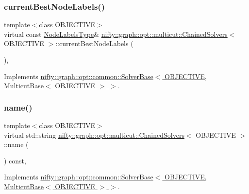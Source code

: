 \subsubsection{\texorpdfstring{current\+Best\+Node\+Labels()}{currentBestNodeLabels()}}
{\footnotesize\ttfamily template$<$class O\+B\+J\+E\+C\+T\+I\+VE$>$ \\
virtual const \hyperlink{classnifty_1_1graph_1_1opt_1_1multicut_1_1ChainedSolvers_a44d5163a198e88948d9301370c2aead5}{Node\+Labels\+Type}\& \hyperlink{classnifty_1_1graph_1_1opt_1_1multicut_1_1ChainedSolvers}{nifty\+::graph\+::opt\+::multicut\+::\+Chained\+Solvers}$<$ O\+B\+J\+E\+C\+T\+I\+VE $>$\+::current\+Best\+Node\+Labels (\begin{DoxyParamCaption}{ }\end{DoxyParamCaption})\hspace{0.3cm}{\ttfamily [inline]}, {\ttfamily [virtual]}}



Implements \hyperlink{classnifty_1_1graph_1_1opt_1_1common_1_1SolverBase_a7bbe01ee201cf3157b251e54c5ff0619}{nifty\+::graph\+::opt\+::common\+::\+Solver\+Base$<$ O\+B\+J\+E\+C\+T\+I\+V\+E, Multicut\+Base$<$ O\+B\+J\+E\+C\+T\+I\+V\+E $>$ $>$}.

\mbox{\label{classnifty_1_1graph_1_1opt_1_1multicut_1_1ChainedSolvers_a32a1e08e4650b8004d3e97afadec2380}} 
\subsubsection{\texorpdfstring{name()}{name()}}
{\footnotesize\ttfamily template$<$class O\+B\+J\+E\+C\+T\+I\+VE$>$ \\
virtual std\+::string \hyperlink{classnifty_1_1graph_1_1opt_1_1multicut_1_1ChainedSolvers}{nifty\+::graph\+::opt\+::multicut\+::\+Chained\+Solvers}$<$ O\+B\+J\+E\+C\+T\+I\+VE $>$\+::name (\begin{DoxyParamCaption}{ }\end{DoxyParamCaption}) const\hspace{0.3cm}{\ttfamily [inline]}, {\ttfamily [virtual]}}



Implements \hyperlink{classnifty_1_1graph_1_1opt_1_1common_1_1SolverBase_af638b9a804cfec3e35fe87c77e942d30}{nifty\+::graph\+::opt\+::common\+::\+Solver\+Base$<$ O\+B\+J\+E\+C\+T\+I\+V\+E, Multicut\+Base$<$ O\+B\+J\+E\+C\+T\+I\+V\+E $>$ $>$}.

